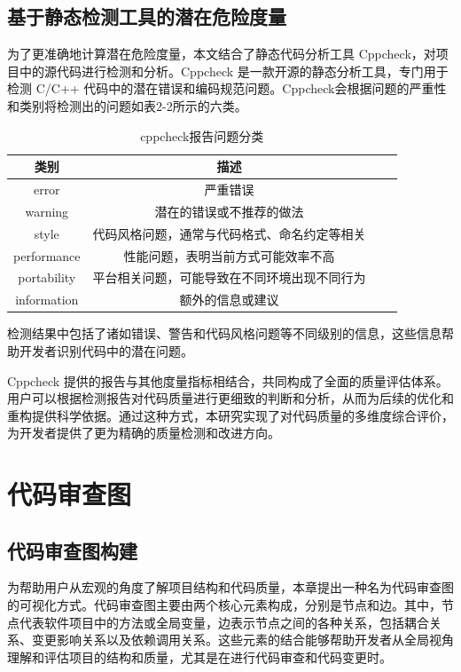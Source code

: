 \subsection{基于静态检测工具的潜在危险度量}

为了更准确地计算潜在危险度量，本文结合了静态代码分析工具 Cppcheck，对项目中的源代码进行检测和分析。Cppcheck 是一款开源的静态分析工具，专门用于检测 C/C++ 代码中的潜在错误和编码规范问题。Cppcheck会根据问题的严重性和类别将检测出的问题如表2-2所示的六类。

\begin{table}[htbp]
\caption{cppcheck报告问题分类}
\vspace{0.5em}\centering\wuhao
\begin{tabular}{cccc}
\toprule
类别 & 描述 \\
\midrule
error &  严重错误 \\
warning & 潜在的错误或不推荐的做法 \\
style & 代码风格问题，通常与代码格式、命名约定等相关 \\
performance & 性能问题，表明当前方式可能效率不高 \\ 
portability & 平台相关问题，可能导致在不同环境出现不同行为 \\
information & 额外的信息或建议 \\ 
\bottomrule
\end{tabular}
\end{table}

检测结果中包括了诸如错误、警告和代码风格问题等不同级别的信息，这些信息帮助开发者识别代码中的潜在问题。

Cppcheck 提供的报告与其他度量指标相结合，共同构成了全面的质量评估体系。用户可以根据检测报告对代码质量进行更细致的判断和分析，从而为后续的优化和重构提供科学依据。通过这种方式，本研究实现了对代码质量的多维度综合评价，为开发者提供了更为精确的质量检测和改进方向。



\section{代码审查图}

\subsection{代码审查图构建}

为帮助用户从宏观的角度了解项目结构和代码质量，本章提出一种名为代码审查图的可视化方式。代码审查图主要由两个核心元素构成，分别是节点和边。其中，节点代表软件项目中的方法或全局变量，边表示节点之间的各种关系，包括耦合关系、变更影响关系以及依赖调用关系。这些元素的结合能够帮助开发者从全局视角理解和评估项目的结构和质量，尤其是在进行代码审查和代码变更时。


